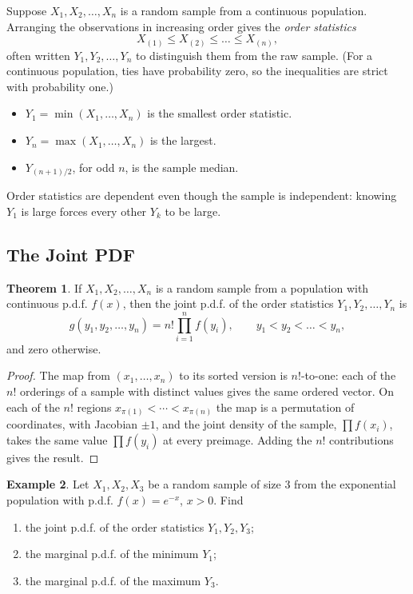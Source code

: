 \documentclass[12pt,a4paper]{report}
\theoremstyle{definition}
\newtheorem{thm}{Theorem}[section]
\newtheorem{example}[thm]{Example}
\theoremstyle{plain}
\begin{document}
Suppose $X_1, X_2, \dots, X_n$ is a random sample from a continuous population.
Arranging the observations in increasing order gives the \emph{order
statistics}
\[ X_{(1)} \leq X_{(2)} \leq \dots \leq X_{(n)} ,\]
often written $Y_1, Y_2, \dots, Y_n$ to distinguish them from the raw sample.
(For a continuous population, ties have probability zero, so the inequalities
are strict with probability one.)
\begin{itemize}
\item $Y_1 = \min(X_1, \dots, X_n)$ is the smallest order statistic.
\item $Y_n = \max(X_1, \dots, X_n)$ is the largest.
\item $Y_{(n+1)/2}$, for odd $n$, is the sample median.
\end{itemize}
Order statistics are dependent even though the sample is independent: knowing
$Y_1$ is large forces every other $Y_k$ to be large.

\subsection{The Joint PDF}

\begin{thm}
\label{thm:orderjoint}
If $X_1, X_2, \dots, X_n$ is a random sample from a population with continuous
p.d.f. $f(x)$, then the joint p.d.f. of the order statistics $Y_1, Y_2, \dots,
Y_n$ is
\[ g(y_1, y_2, \dots, y_n) = n! \prod_{i=1}^n f(y_i), \qquad y_1 < y_2 < \dots <
y_n ,\]
and zero otherwise.
\end{thm}

\begin{proof}
The map from $(x_1,\dots,x_n)$ to its sorted version is $n!$-to-one: each of the
$n!$ orderings of a sample with distinct values gives the same ordered vector.
On each of the $n!$ regions $x_{\pi(1)}<\cdots<x_{\pi(n)}$ the map is a
permutation of coordinates, with Jacobian $\pm 1$, and the joint density of the
sample, $\prod f(x_i)$, takes the same value $\prod f(y_i)$ at every
preimage. Adding the $n!$ contributions gives the result.
\end{proof}

\begin{example}
\label{ex:orderexp}
Let $X_1, X_2, X_3$ be a random sample of size $3$ from the exponential
population with p.d.f. $f(x) = e^{-x}$, $x > 0$. Find
\begin{enumerate}
\item[(i)] the joint p.d.f. of the order statistics $Y_1, Y_2, Y_3$;
\item[(ii)] the marginal p.d.f. of the minimum $Y_1$;
\item[(iii)] the marginal p.d.f. of the maximum $Y_3$.
\end{enumerate}
\end{example}
\end{document}
